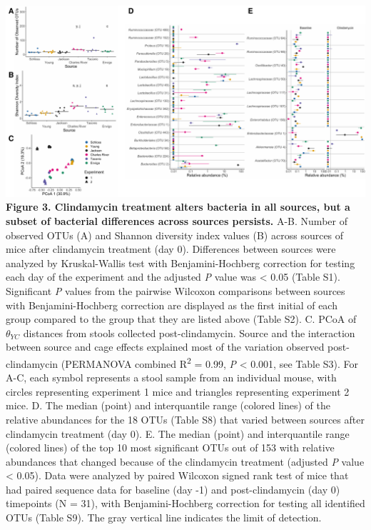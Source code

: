 \documentclass[
  11pt,
]{article}
\begin{document}
\includegraphics{figure_3.pdf} \textbf{Figure 3. Clindamycin treatment
alters bacteria in all sources, but a subset of bacterial differences
across sources persists.} A-B. Number of observed OTUs (A) and Shannon
diversity index values (B) across sources of mice after clindamycin
treatment (day 0). Differences between sources were analyzed by
Kruskal-Wallis test with Benjamini-Hochberg correction for testing each
day of the experiment and the adjusted \emph{P} value was \textless{}
0.05 (Table S1). Significant \emph{P} values from the pairwise Wilcoxon
comparisons between sources with Benjamini-Hochberg correction are
displayed as the first initial of each group compared to the group that
they are listed above (Table S2). C. PCoA of \(\theta_{YC}\) distances
from stools collected post-clindamycin. Source and the interaction
between source and cage effects explained most of the variation observed
post-clindamycin (PERMANOVA combined R\textsuperscript{2} = 0.99,
\emph{P} \textless{} 0.001, see Table S3). For A-C, each symbol
represents a stool sample from an individual mouse, with circles
representing experiment 1 mice and triangles representing experiment 2
mice. D. The median (point) and interquantile range (colored lines) of
the relative abundances for the 18 OTUs (Table S8) that varied between
sources after clindamycin treatment (day 0). E. The median (point) and
interquantile range (colored lines) of the top 10 most significant OTUs
out of 153 with relative abundances that changed because of the
clindamycin treatment (adjusted \emph{P} value \textless{} 0.05). Data
were analyzed by paired Wilcoxon signed rank test of mice that had
paired sequence data for baseline (day -1) and post-clindamycin (day 0)
timepoints (N = 31), with Benjamini-Hochberg correction for testing all
identified OTUs (Table S9). The gray vertical line indicates the limit
of detection.
\end{document}
